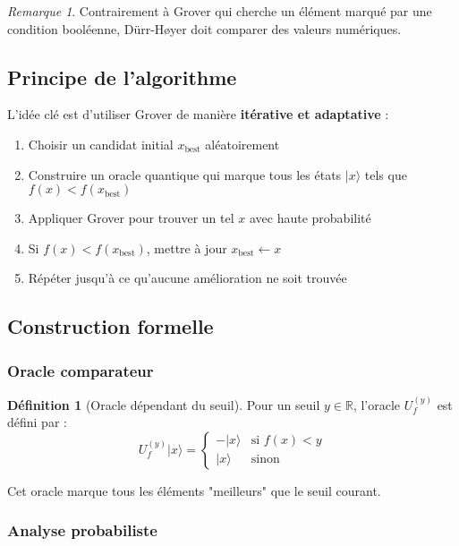\documentclass[12pt,a4paper]{article}
\theoremstyle{definition}
\newtheorem{definition}[theorem]{Définition}
\theoremstyle{remark}
\newtheorem{remark}[theorem]{Remarque}
\begin{document}
\begin{remark}
Contrairement à Grover qui cherche un élément marqué par une condition booléenne, Dürr-Høyer doit comparer des valeurs numériques.
\end{remark}

\subsection{Principe de l'algorithme}

L'idée clé est d'utiliser Grover de manière \textbf{itérative et adaptative} :

\begin{enumerate}
    \item Choisir un candidat initial $x_{\text{best}}$ aléatoirement
    \item Construire un oracle quantique qui marque tous les états $|x\rangle$ tels que $f(x) < f(x_{\text{best}})$
    \item Appliquer Grover pour trouver un tel $x$ avec haute probabilité
    \item Si $f(x) < f(x_{\text{best}})$, mettre à jour $x_{\text{best}} \leftarrow x$
    \item Répéter jusqu'à ce qu'aucune amélioration ne soit trouvée
\end{enumerate}

\subsection{Construction formelle}

\subsubsection{Oracle comparateur}

\begin{definition}[Oracle dépendant du seuil]
Pour un seuil $y \in \mathbb{R}$, l'oracle $U_f^{(y)}$ est défini par :
\[
U_f^{(y)} |x\rangle = \begin{cases}
-|x\rangle & \text{si } f(x) < y \\
|x\rangle & \text{sinon}
\end{cases}
\]
\end{definition}

Cet oracle marque tous les éléments "meilleurs" que le seuil courant.

\subsubsection{Analyse probabiliste}
\end{document}

